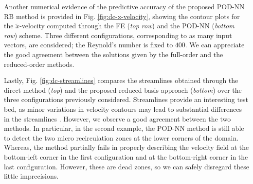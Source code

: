 \documentclass{elsarticle}
\numberwithin{equation}{section}
\theoremstyle{theorem}
\theoremstyle{definition}
\theoremstyle{remark}
\theoremstyle{proposition}
\numberwithin{figure}{section}
\newcommand{\wt}[1]{\widetilde{#1}}
\begin{document}
		
		Another numerical evidence of the predictive accuracy of the proposed POD-NN RB method is provided in Fig. \ref{fig:dc-x-velocity}, showing the contour plots for the $\wt{x}$-velocity computed through the FE (\emph{top row}) and the POD-NN (\emph{bottom row}) scheme. Three different configurations, corresponding to as many input vectors, are considered; the Reynold's number is fixed to $400$. We can appreciate the good agreement between the solutions given by the full-order and the reduced-order methods. 
														
		Lastly, Fig. \ref{fig:dc-streamlines} compares the streamlines obtained through the direct method (\emph{top}) and the proposed reduced basis approach (\emph{bottom}) over the three configurations previously considered. Streamlines provide an interesting test bed, as minor variations in velocity contours may lead to substantial differences in the streamlines \cite{Chen17}. However, we observe a good agreement between the two methods. In particular, in the second example, the POD-NN method is still able to detect the two micro recirculation zones at the lower corners of the domain. Whereas, the method partially fails in properly describing the velocity field at the bottom-left corner in the first configuration and at the bottom-right corner in the last configuration. However, these are dead zones, so we can safely disregard these little imprecisions.
				
\end{document}

